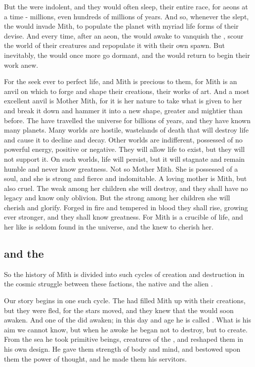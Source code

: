 But the \krakens{} were indolent, and they would often sleep, their entire race, for aeons at a time - millions, even hundreds of millions of years. And so, whenever the \krakens{} slept, the \voyagers{} would invade Mith, to populate the planet with myriad life forms of their devise. And every time, after an aeon, the \krakens{} would awake to vanquish the \voyagers{}, scour the world of their creatures and repopulate it with their own spawn. But inevitably, the \krakens{} would once more go dormant, and the \voyagers{} would return to begin their work anew. 

For the \voyagers{} seek ever to perfect life, and Mith is precious to them, for Mith is an anvil on which to forge and shape their creations, their works of art. And a most excellent anvil is Mother Mith, for it is her nature to take what is given to her and break it down and hammer it into a new shape, greater and mightier than before. The \voyagers{} have travelled the universe for billions of years, and they have known many planets. Many worlds are hostile, wastelands of death that will destroy life and cause it to decline and decay. Other worlds are indifferent, possessed of no powerful energy, positive or negative. They will allow life to exist, but they will not support it. On such worlds, life will persist, but it will stagnate and remain humble and never know greatness. Not so Mother Mith. She is possessed of a soul, and she is strong and fierce and indomitable. A loving mother is Mith, but also cruel. The weak among her children she will destroy, and they shall have no legacy and know only oblivion. But the strong among her children she will cherish and glorify. Forged in fire and tempered in blood they shall rise, growing ever stronger, and they shall know greatness. For Mith is a crucible of life, and her like is seldom found in the universe, and the \voyagers{} knew to cherish her. 

\subsection{\Moroch{} and the \nagae{}}
So the history of Mith is divided into such cycles of creation and destruction in the cosmic struggle between these factions, the native \krakens{} and the alien \voyagers{}. 

Our story begins in one such cycle. The \voyagers{} had filled Mith up with their creations, but they were fled, for the stars moved, and they knew that the \krakens{} would soon awaken. And one of the \krakens{} did awaken; in this day and age he is called \Moroch{}. What is his aim we cannot know, but when he awoke he began not to destroy, but to create. From the sea he took primitive beings, creatures of the \voyagers{}, and reshaped them in his own design. He gave them strength of body and mind, and bestowed upon them the power of thought, and he made them his servitors. 

